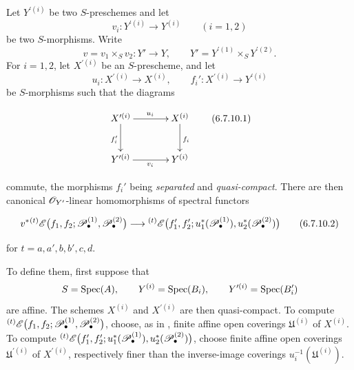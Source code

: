\begin{env}[6.7.10]
\label{III.6.7.10}
Let $Y^{\prime(i)}$ be two $S$-preschemes and let
\[
  v_i:Y^{\prime(i)}\longrightarrow Y^{(i)}
  \qquad (i=1,2)
\]
be two $S$-morphisms.  Write
\[
  v=v_1\times_Sv_2:Y'\longrightarrow Y,
  \qquad
  Y'=Y^{\prime(1)}\times_SY^{\prime(2)}.
\]
For $i=1,2$, let $X^{\prime(i)}$ be an $S$-prescheme, and let
\[
  u_i:X^{\prime(i)}\longrightarrow X^{(i)},
  \qquad
  f_i':X^{\prime(i)}\longrightarrow Y^{\prime(i)}
\]
be $S$-morphisms such that the diagrams
\begin{env}[6.7.10.1]
\label{III.6.7.10.1}
\[
\xymatrix@C=36pt@R=28pt{
  X^{\prime(i)} \ar[r]^{u_i}\ar[d]_{f_i'}
  & X^{(i)}\ar[d]^{f_i}
  \\
  Y^{\prime(i)} \ar[r]_{v_i}
  & Y^{(i)}
}
\tag{6.7.10.1}\label{III.6.7.10.1.eq}
\]
\end{env}
commute, the morphisms $f_i'$ being \emph{separated} and \emph{quasi-compact}.
There are then canonical $\mathscr{O}_{Y'}$-linear homomorphisms of
spectral functors
\begin{env}[6.7.10.2]
\label{III.6.7.10.2}
\[
  v^*
  {}^{(t)}\mathscr{E}
  \bigl(
    f_1,f_2;
    \mathscr{P}_\bullet^{(1)},\mathscr{P}_\bullet^{(2)}
  \bigr)
  \longrightarrow
  {}^{(t)}\mathscr{E}
  \bigl(
    f_1',f_2';
    u_1^*(\mathscr{P}_\bullet^{(1)}),
    u_2^*(\mathscr{P}_\bullet^{(2)})
  \bigr)
  \tag{6.7.10.2}\label{III.6.7.10.2.eq}
\]
\end{env}
for $t=a,a',b,b',c,d$.

To define them, first suppose that
\[
  S=\operatorname{Spec}(A),\qquad
  Y^{(i)}=\operatorname{Spec}(B_i),\qquad
  Y^{\prime(i)}=\operatorname{Spec}(B_i')
\]
are affine.  The schemes $X^{(i)}$ and $X^{\prime(i)}$ are then
quasi-compact.  To compute ${}^{(t)}\mathscr{E}
\bigl(
f_1,f_2;
\mathscr{P}_\bullet^{(1)},\mathscr{P}_\bullet^{(2)}
\bigr)$,
choose, as in , finite affine open coverings
$\mathfrak U^{(i)}$ of $X^{(i)}$.  To compute ${}^{(t)}\mathscr{E}
\bigl(
f_1',f_2';
u_1^*(\mathscr{P}_\bullet^{(1)}),
u_2^*(\mathscr{P}_\bullet^{(2)})
\bigr)$,
choose finite affine open coverings $\mathfrak U^{\prime(i)}$ of
$X^{\prime(i)}$, respectively finer than the inverse-image
coverings $u_i^{-1}(\mathfrak U^{(i)})$.



\end{env}
